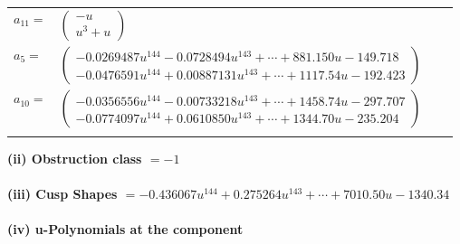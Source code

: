 \documentclass[1p]{elsarticle_modified}
\theoremstyle{definition}
\begin{document}
\begin{tabular}{m{7pt} m{180pt} m{7pt} m{180pt} }
\flushright $a_{11}=$&$\begin{pmatrix}- u\\u^3+u\end{pmatrix}$ \\
\flushright $a_{5}=$&$\begin{pmatrix}-0.0269487 u^{144}-0.0728494 u^{143}+\cdots+881.150 u-149.718\\-0.0476591 u^{144}+0.00887131 u^{143}+\cdots+1117.54 u-192.423\end{pmatrix}$ \\
\flushright $a_{10}=$&$\begin{pmatrix}-0.0356556 u^{144}-0.00733218 u^{143}+\cdots+1458.74 u-297.707\\-0.0774097 u^{144}+0.0610850 u^{143}+\cdots+1344.70 u-235.204\end{pmatrix}$\\&\end{tabular}
\flushleft \textbf{(ii) Obstruction class $= -1$}\\~\\
\flushleft \textbf{(iii) Cusp Shapes $= -0.436067 u^{144}+0.275264 u^{143}+\cdots+7010.50 u-1340.34$}\\~\\
\newpage\renewcommand{\arraystretch}{1}
\flushleft \textbf{(iv) u-Polynomials at the component}\newline \\
\end{document}
